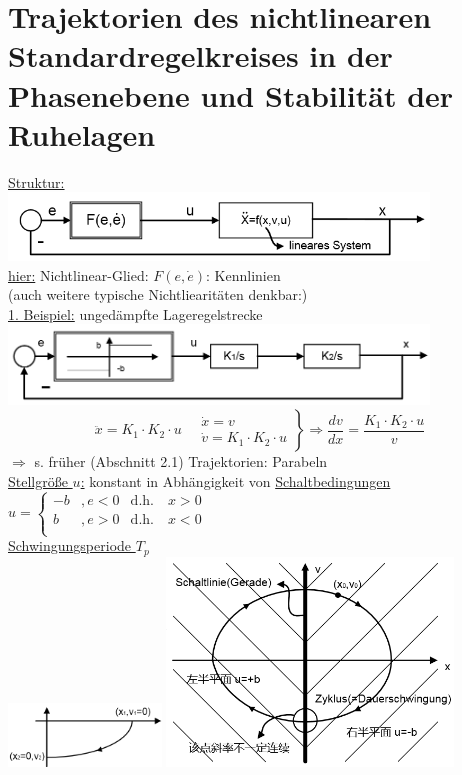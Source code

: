 \documentclass[openany,a4paper,11pt]{book}
\begin{document}
\section[Trajektorien \& Stabilität der Ruhelagen]{Trajektorien des nichtlinearen Standardregelkreises in der Phasenebene und Stabilität der Ruhelagen}
\uline{Struktur:} \\
\includegraphics[width=4.4in]{imgs/NLR10.png}\\
\uline{hier:} Nichtlinear-Glied: $F(e,\dot{e})$: Kennlinien\\
(auch weitere typische Nichtliearitäten denkbar:)\\
\uline{1. Beispiel:} ungedämpfte Lageregelstrecke\\
\includegraphics[width=4.4in]{imgs/NLR11.png}
\[\ddot{x}=K_1\cdot K_2\cdot u \quad 
\left.
\begin{array}{r}
\dot{x}=v\\
\dot{v}=K_1\cdot K_2\cdot u
\end{array}
\right\} \Rightarrow \frac{dv}{dx}=\frac{K_1\cdot K_2\cdot u}{v} \]
$\Rightarrow$ s. früher (Abschnitt 2.1) Trajektorien: Parabeln \\
\uline{Stellgröße $u$:} konstant in Abhängigkeit von \uline{Schaltbedingungen}\\
$u = \left \{%
\begin{array}{lcrcl}
     -b & ,e<0 & \text{d.h.} \quad x>0 \\
     b & ,e>0 & \text{d.h.} \quad x<0 \\
\end{array} \right.$ \\
\uline{Schwingungsperiode $T_p$}\\
\includegraphics[width=1.6in]{imgs/NLR12.png} \includegraphics[width=3in]{imgs/NLR13.png}\\
\end{document}
